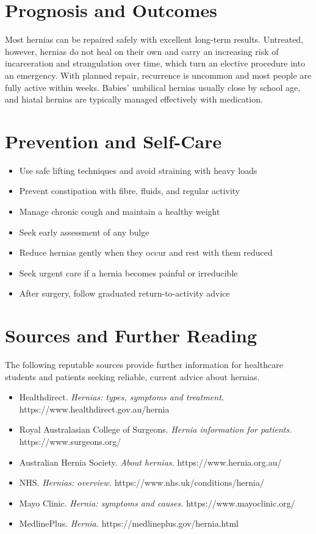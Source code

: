 \section*{Prognosis and Outcomes}
Most hernias can be repaired safely with excellent long-term results. Untreated, however, hernias do not heal on their own and carry an increasing risk of incarceration and strangulation over time, which turn an elective procedure into an emergency. With planned repair, recurrence is uncommon and most people are fully active within weeks. Babies' umbilical hernias usually close by school age, and hiatal hernias are typically managed effectively with medication.

\section*{Prevention and Self-Care}
\begin{itemize}
    \item Use safe lifting techniques and avoid straining with heavy loads
    \item Prevent constipation with fibre, fluids, and regular activity
    \item Manage chronic cough and maintain a healthy weight
    \item Seek early assessment of any bulge
    \item Reduce hernias gently when they occur and rest with them reduced
    \item Seek urgent care if a hernia becomes painful or irreducible
    \item After surgery, follow graduated return-to-activity advice
\end{itemize}

\section*{Sources and Further Reading}
The following reputable sources provide further information for healthcare students and patients seeking reliable, current advice about hernias.

\begin{itemize}
    \item Healthdirect. \textit{Hernias: types, symptoms and treatment.} https://www.healthdirect.gov.au/hernia
    \item Royal Australasian College of Surgeons. \textit{Hernia information for patients.} https://www.surgeons.org/
    \item Australian Hernia Society. \textit{About hernias.} https://www.hernia.org.au/
    \item NHS. \textit{Hernias: overview.} https://www.nhs.uk/conditions/hernia/
    \item Mayo Clinic. \textit{Hernia: symptoms and causes.} https://www.mayoclinic.org/
    \item MedlinePlus. \textit{Hernia.} https://medlineplus.gov/hernia.html
\end{itemize}
